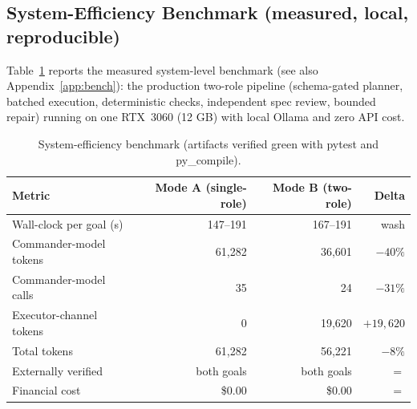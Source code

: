 \documentclass[11pt]{article}
\begin{document}
\subsection{System-Efficiency Benchmark (measured, local, reproducible)}
Table~\ref{tab:system} reports the measured system-level benchmark (see also
Appendix~\ref{app:bench}): the production two-role pipeline (schema-gated planner,
batched execution, deterministic checks, independent spec review, bounded repair) running
on one RTX~3060 (12 GB) with local Ollama and zero API cost.

\begin{table}[h!t]\centering
\caption{System-efficiency benchmark (artifacts verified green with pytest and
py\_compile). \label{tab:system}}
\begin{tabular}{@{}lr r r@{}}
\toprule
Metric & Mode A (single-role) & Mode B (two-role) & Delta\\
\midrule
Wall-clock per goal (s) & 147--191 & 167--191 & wash\\
Commander-model tokens & 61{,}282 & 36{,}601 & $-40\%$\\
Commander-model calls & 35 & 24 & $-31\%$\\
Executor-channel tokens & 0 & 19{,}620 & $+19{,}620$\\
Total tokens & 61{,}282 & 56{,}221 & $-8\%$\\
Externally verified & both goals & both goals & $=$\\
Financial cost & \$0.00 & \$0.00 & $=$\\
\bottomrule
\end{tabular}
\end{table}
\end{document}
